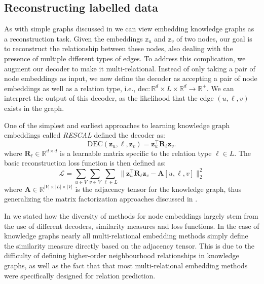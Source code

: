\subsection{Reconstructing labelled data}
As with simple graphs discussed in  we can view embedding knowledge graphs as a reconstruction task. Given the embeddings $\mathbb{z}_u$ and $\mathbb{z}_v$ of two nodes, our goal is to reconstruct the relationship between these nodes, also dealing with the presence of multiple different types of edges.
To address this complication, we augment our decoder to make it multi-relational. Instead of only taking a pair of node embeddings as input, we now define the decoder as accepting a pair of node embeddings as well as a relation type, i.e., $\text{dec}: \mathbb{R}^d \times L \times \mathbb{R}^d \to \mathbb{R}^+$. We can interpret the output of this decoder, as the likelihood that the edge $(u,\ell,v)$ exists in the graph.

One of the simplest and earliest approaches to learning knowledge graph embeddings called \textit{RESCAL} defined the decoder as:
\begin{equation}\label{eq:RESCAL}
    \text{DEC}(\mathbf{z}_u, \ell, \mathbf{z}_v) = \mathbf{z}_u^\top \mathbf{R}_\ell \mathbf{z}_v.
\end{equation}
where $\mathbf{R}_\ell\in \mathbb{R}^{d\times d}$ is a learnable matrix specific to the relation type $\ell\in L$. The basic reconstruction loss function is then defined as:
\begin{equation}\label{eq:reconstructionLossMulti}
    \mathcal{L} = \sum_{u\in V}\sum_{v\in V}\sum_{\ell\in L} \|\mathbf{z}_u^\top \mathbf{R}_\ell \mathbf{z}_v - \mathbf{A}[u,\ell,v]\|_2^2
\end{equation}
where $\mathbf{A}\in\mathbb{R}^{|V|\times|L|\times|V|}$ is the adjacency tensor for the knowledge graph, thus generalizing the matrix factorization approaches discussed in .

\medskip
In  we stated how the diversity of methods for node embeddings largely stem from the use of different decoders, similarity measures and loss functions. In the case of knowledge graphs nearly all multi-relational embedding methods simply define the similarity measure directly based on the adjacency tensor. This is due to the difficulty of defining higher-order neighbourhood relationships in knowledge graphs, as well as the fact that that most multi-relational embedding methods were specifically designed for relation prediction.

